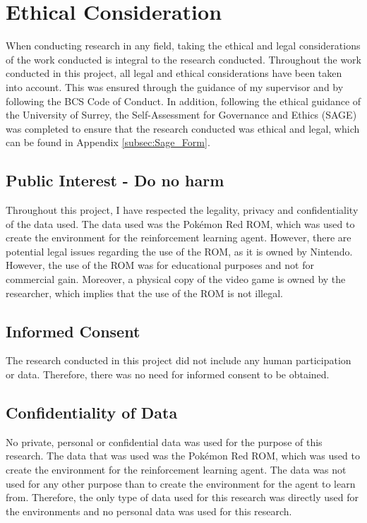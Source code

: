 \section{Ethical Consideration}

When conducting research in any field, taking the ethical and legal considerations of the work conducted is integral to the research conducted. Throughout the work conducted in this project, all legal and ethical considerations have been taken into account. This was ensured through the guidance of my supervisor and by following the BCS Code of Conduct. In addition, following the ethical guidance of the University of Surrey, the Self-Assessment for Governance and Ethics (SAGE) was completed to ensure that the research conducted was ethical and legal, which can be found in Appendix 
\ref{subsec:Sage_Form}.


\subsection{Public Interest - Do no harm}

Throughout this project, I have respected the legality, privacy and confidentiality of the data used. The data used was the Pokémon Red ROM, which was used to create the environment for the reinforcement learning agent. However, there are potential legal issues regarding the use of the ROM, as it is owned by Nintendo. However, the use of the ROM was for educational purposes and not for commercial gain. Moreover, a physical copy of the video game is owned by the researcher, which implies that the use of the ROM is not illegal.

\subsection{Informed Consent}

The research conducted in this project did not include any human participation or data. Therefore, there was no need for informed consent to be obtained.

\subsection{Confidentiality of Data}

No private, personal or confidential data was used for the purpose of this research. The data that was used was the Pokémon Red ROM, which was used to create the environment for the reinforcement learning agent. The data was not used for any other purpose than to create the environment for the agent to learn from. Therefore, the only type of data used for this research was directly used for the environments and no personal data was used for this research.

